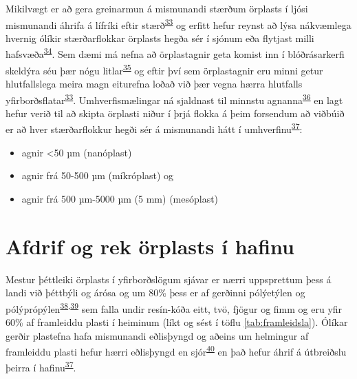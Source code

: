 \documentclass[icelandic,]{book}
\providecommand{\tightlist}{%
  \setlength{\itemsep}{0pt}\setlength{\parskip}{0pt}}
\begin{document}
Mikilvægt er að gera greinarmun á mismunandi stærðum örplasts í ljósi mismunandi áhrifa á lífríki eftir stærð\textsuperscript{\protect\hyperlink{ref-velzeboer2014strong}{33}} og erfitt hefur reynst að lýsa nákvæmlega hvernig ólíkir stærðarflokkar örplasts hegða sér í sjónum eða flytjast milli hafsvæða\textsuperscript{\protect\hyperlink{ref-thompson2015microplastics}{34}}. Sem dæmi má nefna að örplastagnir geta komist inn í blóðrásarkerfi skeldýra séu þær nógu litlar\textsuperscript{\protect\hyperlink{ref-browne2008ingested}{35}} og eftir því sem örplastagnir eru minni getur hlutfallslega meira magn eiturefna loðað við þær vegna hærra hlutfalls yfirborðsflatar\textsuperscript{\protect\hyperlink{ref-velzeboer2014strong}{33}}.
Umhverfismælingar ná sjaldnast til minnstu agnanna\textsuperscript{\protect\hyperlink{ref-loder2015methodology}{36}} en lagt hefur verið til að skipta örplasti niður í þrjá flokka á þeim forsendum að viðbúið er að hver stærðarflokkur hegði sér á mismunandi hátt í umhverfinu\textsuperscript{\protect\hyperlink{ref-andrady2011microplastics}{37}}:

\begin{itemize}
\tightlist
\item
  agnir \textless{}50 µm (nanóplast)
\item
  agnir frá 50-500 µm (míkróplast) og
\item
  agnir frá 500 µm-5000 µm (5 mm) (mesóplast)
\end{itemize}

\hypertarget{afdrif-og-rek-orplasts-i-hafinu}{%
\section*{Afdrif og rek örplasts í hafinu}\label{afdrif-og-rek-orplasts-i-hafinu}}

Mestur þéttleiki örplasts í yfirborðslögum sjávar er nærri uppsprettum þess á landi við þéttbýli og árósa og um 80\% þess er af gerðinni pólýetýlen og pólýprópýlen\textsuperscript{\protect\hyperlink{ref-isobe2014selective}{38},\protect\hyperlink{ref-Gewert2017}{39}} sem falla undir resín-kóða eitt, tvö, fjögur og fimm og eru yfir 60\% af framleiddu plasti í heiminum (líkt og sést í töflu \ref{tab:framleidsla}). Ólíkar gerðir plastefna hafa mismunandi eðlisþyngd og aðeins um helmingur af framleiddu plasti hefur hærri eðlisþyngd en sjór\textsuperscript{\protect\hyperlink{ref-sherrington2016study}{40}} en það hefur áhrif á útbreiðslu þeirra í hafinu\textsuperscript{\protect\hyperlink{ref-andrady2011microplastics}{37}}.
\end{document}
